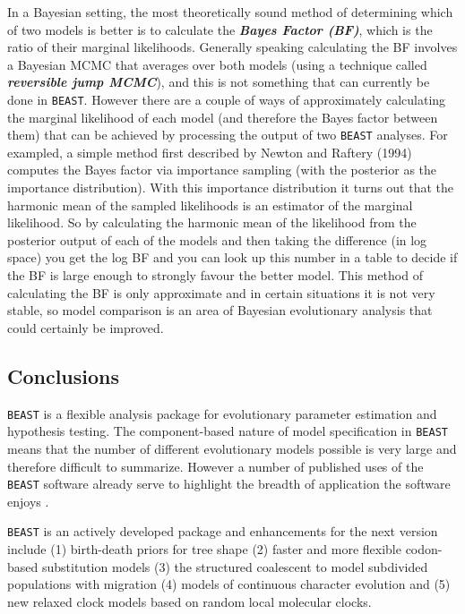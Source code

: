 \documentclass[cup7b, english]{cupbook}
\begin{document}
In a Bayesian setting, the most theoretically sound method of determining which of two models is better is to calculate
the \textbf{\textit{Bayes Factor (BF)}}, which is the ratio of their marginal likelihoods. Generally speaking calculating the BF involves
a Bayesian MCMC that averages over both models (using a technique called \textbf{\textit{reversible jump MCMC}}), and this is not something
that can currently be done in \texttt{BEAST}. However there are a couple of ways of approximately calculating the marginal likelihood
of each model (and therefore the Bayes factor between them) that can be achieved by processing the output of two \texttt{BEAST}
analyses. For exampled, a simple method first described by Newton and Raftery (1994) computes the Bayes factor via
importance sampling (with the posterior as the importance distribution). With this importance distribution it turns out
that the harmonic mean of the sampled likelihoods is an estimator of the marginal likelihood. So by calculating the
harmonic mean of the likelihood from the posterior output of each of the models and then taking the difference (in log
space) you get the log BF and you can look up this number in a table to decide if the BF is large enough to strongly
favour the better model. This method of calculating the BF is only approximate and in certain situations it is not
very stable, so model comparison is an area of Bayesian evolutionary analysis that could certainly be improved.

\subsection{Conclusions}

\texttt{BEAST} is a flexible analysis package for evolutionary parameter estimation
and hypothesis testing. The component-based nature of model specification
in \texttt{BEAST} means that the number of different evolutionary models possible
is very large and therefore difficult to summarize. However a number
of published uses of the \texttt{BEAST} software already serve to highlight
the breadth of application the software enjoys \cite{PDNRR2003,Lemeyetal2004,Shapiroetal2004,DRSP2005,LMDJH2005}.

\texttt{BEAST} is an actively developed package and enhancements for the next
version include (1) birth-death priors for tree shape (2) faster and
more flexible codon-based substitution models (3) the structured coalescent
to model subdivided populations with migration (4) models of continuous
character evolution and (5) new relaxed clock models based on random local molecular clocks.
\end{document}
